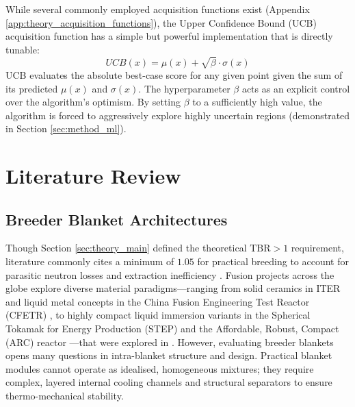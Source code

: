 \documentclass[11pt]{article}
\begin{document}
While several commonly employed acquisition functions exist (Appendix
\ref{app:theory_acquisition_functions}), the Upper Confidence Bound (UCB) acquisition function
\citep{srinivas2012information} has a simple but powerful implementation that is directly tunable:
\begin{equation}
    UCB(x) = \mu(x) + \sqrt{\beta} \cdot \sigma(x)
    \label{eq:UCB}
\end{equation}
UCB evaluates the absolute best-case score for any given point given the sum of its predicted
$\mu(x)$ and $\sigma(x)$. The hyperparameter $\beta$ acts as an explicit control over the
algorithm's optimism. By setting $\beta$ to a sufficiently high value, the algorithm is forced to
aggressively explore highly uncertain regions (demonstrated in Section \ref{sec:method_ml}).



\section{Literature Review}
\subsection{Breeder Blanket Architectures}
\label{sec:breeder_blanket_studies}

Though Section \ref{sec:theory_main} defined the theoretical $\text{TBR}>1$ requirement, literature
commonly cites a minimum of $1.05$ for practical breeding to account for parasitic neutron losses
and extraction inefficiency \citep{tanabe_tritium_2017, hernandez_first_2018, khan_mphys_sem1}.
Fusion projects across the globe explore diverse material paradigms---ranging from solid ceramics in
ITER \citep{federici_overview_2019} and liquid metal concepts in the China Fusion Engineering Test
Reactor (CFETR) \citep{zhuang_progress_2019}, to highly compact liquid immersion variants in the
Spherical Tokamak for Energy Production (STEP) and the Affordable, Robust, Compact (ARC) reactor
\citep{lord_fusing_2024, sorbom_arc_2015}---that were explored in \cite{khan_mphys_sem1}. However,
evaluating breeder blankets opens many questions in intra-blanket structure and design. Practical
blanket modules cannot operate as idealised, homogeneous mixtures; they require complex, layered
internal cooling channels and structural separators to ensure thermo-mechanical stability.
\end{document}
